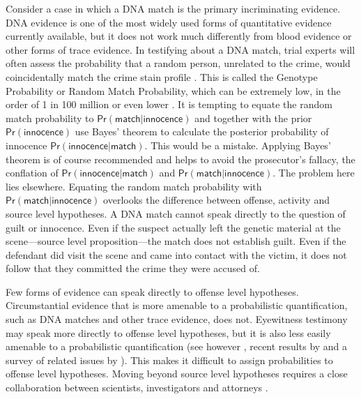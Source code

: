 \documentclass{article}
\newcommand{\pr}{\mathsf{Pr}}
\begin{document}
Consider a case in which a DNA match is the primary incriminating evidence. DNA evidence is one of the most widely used forms of quantitative evidence currently available, but it does not work much differently from blood evidence or other forms of trace evidence. In testifying about a DNA match, trial experts will often assess the probability that a random person, unrelated to the crime, would coincidentally match the crime stain profile  
\citep{foreman2003interpreting}.
This is called the Genotype Probability or Random Match Probability, which can be extremely low, in the order of 1 in 100 million or even lower \citep{donnelly1995NonindependenceMatchesDifferent, Kaye2000ReferDNA,Wasserman2008Forensic}. 
It is tempting to 
equate the random match probability to $\pr(\textsf{match} \vert \textsf{innocence})$ and together with the prior $\pr(\textsf{innocence})$ use Bayes' theorem to calculate  
the posterior probability of innocence $\pr(\textsf{innocence} \vert \textsf{match})$. 
This would be a mistake.
Applying Bayes' theorem is of course recommended and helps to avoid the prosecutor's fallacy, the conflation of $\pr(\textsf{innocence} \vert \textsf{match})$ and $\pr(\textsf{match} \vert \textsf{innocence})$.
The problem here lies elsewhere. 
Equating the random match probability with $\pr(\textsf{match} \vert \textsf{innocence})$ overlooks the difference between offense, activity and source level hypotheses.
A DNA match cannot speak directly to the question of guilt or innocence.  
Even if the suspect actually left the genetic material at the scene---source level proposition---the match does not establish guilt. %
Even if the defendant did visit the scene and came into contact with the victim, it does not follow that they committed the crime they were accused of. 

Few forms of evidence can speak directly to offense level hypotheses. Circumstantial evidence that is more amenable to a probabilistic quantification, such as DNA matches and other trace evidence, does not. 
Eyewitness testimony may speak more directly to offense level hypotheses, but it is also less easily amenable to a probabilistic quantification (see however \citealp{Friedman1987Route-Analysys-}, recent results by \citealp{wixted2017RelationshipEyewitnessConfidence}
 and a survey of related issues by \citealp{Urbaniak2020Decision}).
This makes it  difficult to assign probabilities to offense level hypotheses. %
Moving beyond source level hypotheses requires a close collaboration  between scientists, investigators and attorneys \citep[see][for a discussion]{Cook1998hierarchy}. 
\end{document}
